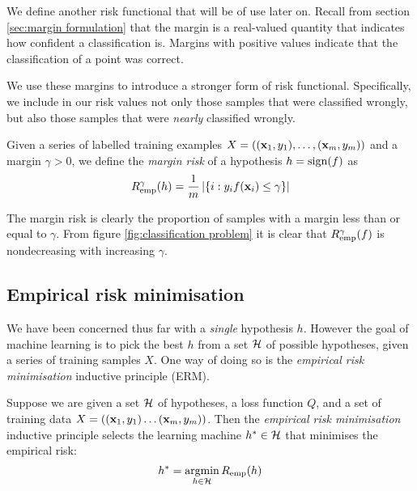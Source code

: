 We define another risk functional that will be of use later on.
Recall from section \ref{sec:margin formulation} that the margin is a
real-valued quantity that indicates how confident a classification
is.  Margins with positive values indicate that the classification of
a point was correct.

We use these margins to introduce a stronger form of risk functional.
Specifically, we include in our risk values not only those samples
that were classified wrongly, but also those samples that were
\emph{nearly} classified wrongly. 

\begin{definition}
\label{def:margin risk}
Given a series of labelled training examples $X = ((\mathbf{x}_1, y_1),
\ldots, (\mathbf{x}_m, y_m))$ and a margin $\gamma>0$, we define the
\emph{margin risk} of a hypothesis $h = \mathrm{sign}(f)$ as
%
\begin{equation}
R^{\gamma}_{\mathrm{emp}}(h) = \frac{1}{m} \left| \left\{ i : y_i f(\mathbf{x}_i) \leq
\gamma \right\} \right| 
\end{equation}
\end{definition}
%
The margin risk is clearly the proportion of samples with a margin
less than or equal to $\gamma$.  From figure \ref{fig:classification
problem} it is clear that $R^{\gamma}_{\mathrm{emp}}(f)$ is nondecreasing with
increasing $\gamma$.


\subsection{Empirical risk minimisation}
\label{sec:erm}
\label{acr:erm}

We have been concerned thus far with a \emph{single} hypothesis
$h$.  However the goal of machine learning is to pick the best
$h$ from a set $\mathcal{H}$ of possible hypotheses, given a series of
training samples $X$.  One way of doing so is the \emph{empirical risk
minimisation} inductive principle (ERM).

\begin{definition}
Suppose we are given a set $\mathcal{H}$ of hypotheses, a loss
function $Q$, and a set of training data $X = ((\mathbf{x}_1, y_1) \ldots
(\mathbf{x}_m,y_m))$.  Then the \emph{empirical risk minimisation} inductive
principle selects the learning machine $h^{\ast} \in \mathcal{H}$ that
minimises the empirical risk:
%
\begin{equation}
h^{\ast} = \argmin_{h \in \calH} R_{\emp}(h)
\label{eqn:erm}
\end{equation}
\end{definition}

